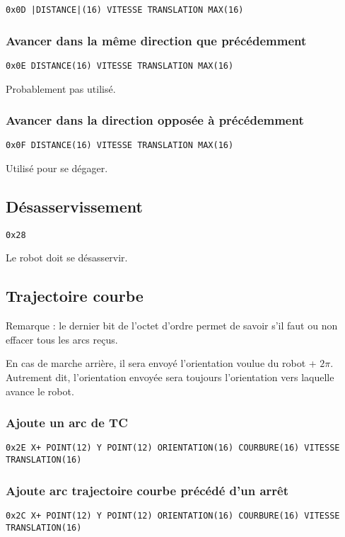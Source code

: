 \documentclass[a4paper, 12pt]{article}
\begin{document}
    \texttt{0x0D |DISTANCE|(16) VITESSE  TRANSLATION  MAX(16)}
    
\subsubsection{Avancer dans la même direction que précédemment}

    \texttt{0x0E DISTANCE(16) VITESSE  TRANSLATION  MAX(16)}
    
Probablement pas utilisé.

\subsubsection{Avancer dans la direction opposée à précédemment}

    \texttt{0x0F DISTANCE(16) VITESSE  TRANSLATION  MAX(16)}

Utilisé pour se dégager.

\subsection{Désasservissement}
    \texttt{0x28}

Le robot doit se désasservir.

\subsection{Trajectoire courbe}

Remarque : le dernier bit de l'octet d'ordre permet de savoir s'il faut ou non effacer tous les arcs reçus.

En cas de marche arrière, il sera envoyé l'orientation voulue du robot + $2\pi$. Autrement dit, l'orientation envoyée sera toujours l'orientation vers laquelle avance le robot.

\subsubsection{Ajoute un arc de TC}

    \texttt{0x2E X+ POINT(12) Y POINT(12) ORIENTATION(16) COURBURE(16) VITESSE  TRANSLATION(16)}
    
\subsubsection{Ajoute arc trajectoire courbe précédé d'un arrêt}

    \texttt{0x2C X+ POINT(12) Y POINT(12) ORIENTATION(16) COURBURE(16) VITESSE TRANSLATION(16)}
\end{document}

